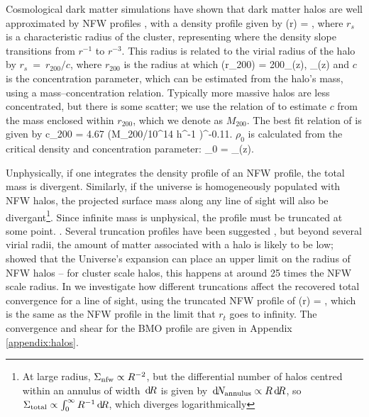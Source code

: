 \documentclass[useAMS,usenatbib]{mn2e}
\begin{document}
Cosmological dark matter simulations have shown that dark matter
halos are well approximated by NFW profiles \citep{NFW1997}, with a density
profile given by
\be\label{eq:rhonfw}
\rho(r) = 
,
\ee
where $r_{s}$ is a characteristic radius of the cluster, representing where
the density slope transitions from $r^{-1}$ to $r^{-3}$. This radius is related
to the virial radius of the halo by $r_{s}~=~r_{200}/c$, where $r_{200}$ is the radius at 
which 
\be
\rho(r_{200}) = 200\rho_{{}}(z),  \rho_{}(z) \equiv {}
\ee
and $c$ is the concentration parameter, which can be estimated from the halo's mass,
using a mass--concentration relation. Typically more massive halos are less concentrated,
but there is some scatter; we use the relation of \citet{neto2007} to estimate $c$
from the mass enclosed within $r_{200}$, which we denote as $M_{200}$. The best fit relation of \citet{neto2007} is given by
\be
c_{200} = 4.67 (M_{200}/10^{14} h^{-1} \Msun)^{-0.11}.
\ee
$\rho_0$ is calculated from the critical density and concentration parameter:
\be
\rho_0 = \rho_{}(z).
\ee

Unphysically, if one integrates the density profile of an NFW profile, the total mass is divergent.
Similarly, if the universe is homogeneously populated with NFW halos, the projected surface mass along any
line of sight will also be divergant\footnote{At large radius, $\Sigma_{\rm
nfw} \propto R^{-2}$, but the differential number of halos centred within an
annulus of width $\, \mathrm{d} \! R$ is given by $\, \mathrm{d} \! N_{\rm annulus} \propto R \, \mathrm{d} \! R$,
so  $\Sigma_{\rm total} \propto \int_{0}^{\infty} R^{-1} \, \mathrm{d} \! R$, which
diverges logarithmically}. Since infinite mass is unphysical, the profile must
be truncated at some point. . Several truncation profiles have been suggested \citep[e.g][]{BMO}, but beyond several virial radii, the amount of matter associated with a halo is likely to be low; \citet{Nandra2012} showed that the Universe's expansion can place an upper limit on the radius of NFW halos -- for cluster scale halos, this happens at around 25 times the NFW scale radius. In  we investigate how different truncations affect the recovered total convergence for a line of sight, using the truncated NFW profile of \citet{BMO}
\be\label{eq:bmoprofile}
\rho(r) = 
,
\ee
which is the same as the NFW profile in the limit that $r_t$ goes to infinity. The convergence and shear for the BMO profile are given in Appendix \ref{appendix:halos}.
\end{document}
